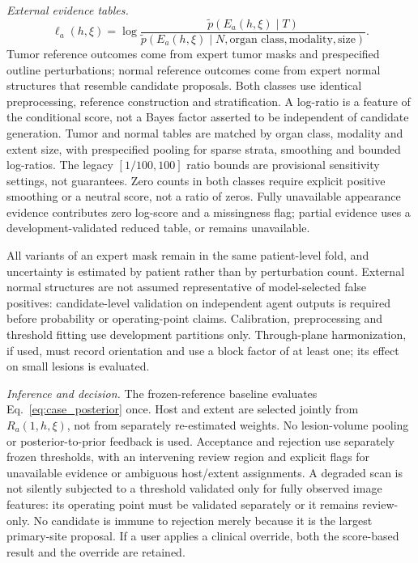 \documentclass[fleqn,10pt]{olplainarticle}
\begin{document}
\emph{External evidence tables.}
\begin{equation}
\label{eq:likelihoods}
\ell_a(h,\xi)=\log\frac{\tilde p(E_a(h,\xi)\mid T)}
{\tilde p(E_a(h,\xi)\mid N,\text{organ class},\text{modality},\text{size})}.
\end{equation}
Tumor reference outcomes come from expert tumor masks and prespecified outline perturbations; normal reference outcomes
come from expert normal structures that resemble candidate proposals. Both classes use identical preprocessing,
reference construction and stratification. A log-ratio is a feature of the conditional score, not a Bayes factor asserted
to be independent of candidate generation. Tumor and normal tables are matched by organ class, modality and extent size,
with prespecified pooling for sparse strata, smoothing and bounded log-ratios. The legacy $[1/100,100]$ ratio bounds are
provisional sensitivity settings, not guarantees. Zero counts in both classes require explicit positive smoothing or a
neutral score, not a ratio of zeros. Fully unavailable appearance evidence contributes zero log-score and a missingness
flag; partial evidence uses a development-validated reduced table, or remains unavailable.

All variants of an expert mask remain in the same patient-level fold, and uncertainty is estimated by patient rather than
by perturbation count. External normal structures are not assumed representative of model-selected false positives:
candidate-level validation on independent agent outputs is required before probability or operating-point claims.
Calibration, preprocessing and threshold fitting use development partitions only. Through-plane harmonization, if used,
must record orientation and use a block factor of at least one; its effect on small lesions is evaluated.

\emph{Inference and decision.}
The frozen-reference baseline evaluates Eq.~\eqref{eq:case_posterior} once. Host and extent are selected jointly from
$R_a(1,h,\xi)$, not from separately re-estimated weights. No lesion-volume pooling or posterior-to-prior feedback is used.
Acceptance and rejection use separately frozen thresholds, with an intervening review region and explicit flags for
unavailable evidence or ambiguous host/extent assignments. A degraded scan is not silently subjected to a threshold
validated only for fully observed image features: its operating point must be validated separately or it remains review-only.
No candidate is immune to rejection merely because it is the largest primary-site proposal. If a user applies a clinical
override, both the score-based result and the override are retained.
\end{document}
